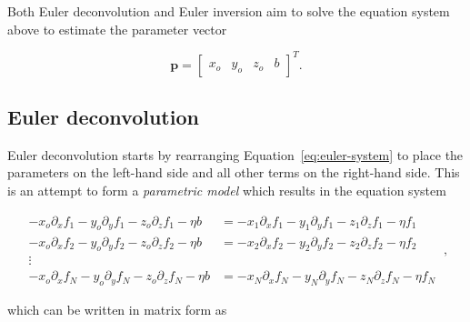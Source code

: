 \noindent
Both Euler deconvolution and Euler inversion aim to solve the equation system
above to estimate the parameter vector

\begin{equation}
  \mathbf{p} = \begin{bmatrix}x_o & y_o & z_o & b \end{bmatrix}^T.
  \label{eq:p}
\end{equation}


\subsection{Euler deconvolution}

Euler deconvolution starts by rearranging Equation~\ref{eq:euler-system} to
place the parameters on the left-hand side and all other terms on the
right-hand side. This is an attempt to form a \textit{parametric model} which
results in the equation system

\begin{equation}
  \begin{aligned}
  -x_o\partial_x f_1 - y_o\partial_y f_1 - z_o\partial_z f_1 - \eta b &= -x_1\partial_x f_1 - y_1\partial_y f_1 - z_1\partial_z f_1 - \eta f_1
  \\
  -x_o\partial_x f_2 - y_o\partial_y f_2 - z_o\partial_z f_2 - \eta b &= -x_2\partial_x f_2 - y_2\partial_y f_2 - z_2\partial_z f_2 - \eta f_2
  \\
  \vdots
  \\
  -x_o\partial_x f_N - y_o\partial_y f_N - z_o\partial_z f_N - \eta b &= -x_N\partial_x f_N - y_N\partial_y f_N - z_N\partial_z f_N - \eta f_N
  \end{aligned}
  \ ,
\end{equation}

\noindent
which can be written in matrix form as

